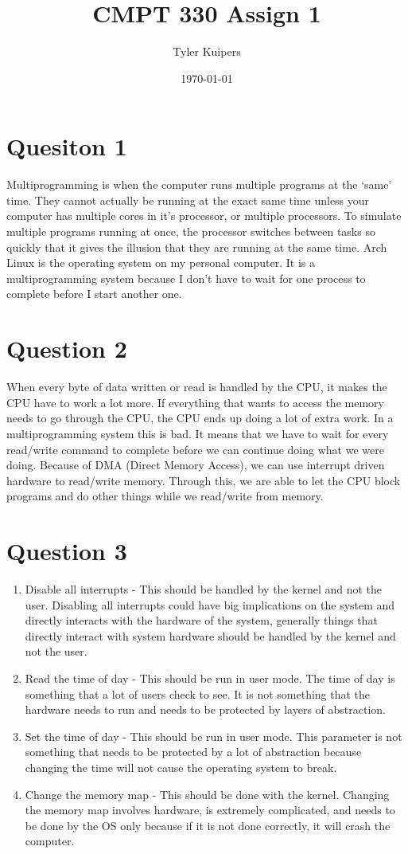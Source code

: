 \documentclass[12pt]{extarticle}
\title{CMPT 330 Assign 1}
\author{Tyler Kuipers}
\date{\today}
\begin{document}
	\maketitle

	\section*{Quesiton 1}
		Multiprogramming is when the computer runs multiple programs at the `same' time.  They cannot actually be running at the exact same time unless your computer has multiple cores in it's processor, or multiple processors.  To simulate multiple programs running at once, the processor switches between tasks so quickly that it gives the illusion that they are running at the same time.  Arch Linux is the operating system on my personal computer.  It is a multiprogramming system because I don't have to wait for one process to complete before I start another one.

	\section*{Question 2}
		When every byte of data written or read is handled by the CPU, it makes the CPU have to work a lot more.  If everything that wants to access the memory needs to go through the CPU, the CPU ends up doing a lot of extra work.  In a multiprogramming system this is bad.  It means that we have to wait for every read/write command to complete before we can continue doing what we were doing.  Because of DMA (Direct Memory Access), we can use interrupt driven hardware to read/write memory.  Through this, we are able to let the CPU block programs and do other things while we read/write from memory.

	\section*{Question 3}  
		\begin{enumerate}
			\item Disable all interrupts - This should be handled by the kernel and not the user.  Disabling all interrupts could have big implications on the system and directly interacts with the hardware of the system, generally things that directly interact with system hardware should be handled by the kernel and not the user.
			\item Read the time of day - This should be run in user mode.  The time of day is something that a lot of users check to see.  It is not something that the hardware needs to run and needs to be protected by layers of abstraction.
			\item Set the time of day - This should be run in user mode.  This parameter is not something that needs to be protected by a lot of abstraction because changing the time will not cause the operating system to break.
			\item Change the memory map - This should be done with the kernel.  Changing the memory map involves hardware, is extremely complicated, and needs to be done by the OS only because if it is not done correctly, it will crash the computer. 
		\end{enumerate}
\end{document}

